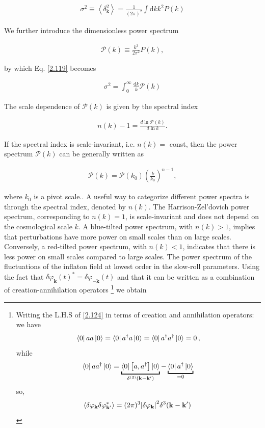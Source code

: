 \begin{align}
    \sigma^{2} \equiv\left\langle\delta_{\mathrm{k}}^{2}\right\rangle=\frac{1}{(2 \pi)^{2}} \int \mathrm{d}k k^2 P(k)  \label{2.119}
\end{align}



We further introduce the dimensionless power spectrum

\begin{align}
    \mathcal{P}(k) \equiv \frac{k^{3}}{2 \pi^{2}} P(k), \label{2.120}
\end{align}



by which Eq. \ref{2.119} becomes

\begin{align}
    \sigma^{2}=\int_{0}^{\infty} \frac{\mathrm{d} k}{k} \mathcal{P}(k) \label{2.121}
\end{align}



The scale dependence of $\mathcal{P}(k)$ is given by the spectral index

\begin{align}
    n(k)-1=\frac{d \ln \mathcal{P}(k)}{d \ln k} . \label{2.122}
\end{align}



If the spectral index is scale-invariant, i.e. $n(k)=$ const, then the power spectrum $\mathcal{P}(k)$ can be generally written as

\begin{align}
    \mathcal{P}(k)=\mathcal{P}\left(k_{0}\right)\left(\frac{k}{k_{0}}\right)^{n-1}, \label{2.123}
\end{align}

where $k_{0}$ is a pivot scale.. A useful way to categorize different power spectra is through the spectral index, denoted by $n(k)$. The Harrison-Zel'dovich power spectrum, corresponding to $n(k)=1$, is scale-invariant and does not depend on the cosmological scale $k$. A blue-tilted power spectrum, with $n(k)>1$, implies that perturbations have more power on small scales than on large scales. Conversely, a red-tilted power spectrum, with $n(k)<1$, indicates that there is less power on small scales compared to large scales.
The power spectrum of the fluctuations of the inflaton field at lowest order in the slow-roll parameters. Using the fact that $\delta \varphi_{\mathbf{k}}(t)^{*}=\delta \varphi_{-\mathbf{k}}(t)$ and that it can be written as a combination of creation-annihilation operators
\footnote{Writing the L.H.S of \ref{2.124} in terms of creation and annihilation operators: we have $$\bra{0} a a \ket{0}=\bra{0} a ^\dag a  \ket{0}= \bra{0} a ^\dag a ^\dag \ket{0}= 0 \,,$$
while $$\bra{0} a a ^\dag \ket{0} = \underbracket{\bra{0} \qty[a, a ^\dag] \ket{0}}_{\delta^{(3)} (\mathbf{k} - \mathbf{k'})} - \underbracket{\bra{0} a ^\dag \ket{0}}_{= 0} \,$$
so,
$$
\expval{ \delta \varphi _{\mathbf{k}} \delta \varphi _{\mathbf{k'}}^{*}} = (2 \pi )^3 \abs{ \delta \varphi _{\mathbf{k}}}^2 \delta^3(\mathbf{k} -\mathbf{k'})\
$$
}
we obtain


